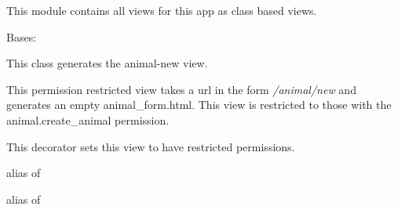 \documentclass[letterpaper,10pt,english]{sphinxmanual}
\begin{document}
This module contains all views for this app as class based views.


\begin{fulllineitems}
\label{api:mousedb.animal.views.AnimalCreate}
Bases: \href{http://docs.djangoproject.com/en/dev/ref/class-based-views/\#django.views.generic.edit.CreateView}{}

This class generates the animal-new view.

This permission restricted view takes a url in the form \emph{/animal/new} and generates an empty animal\_form.html.
This view is restricted to those with the animal.create\_animal permission.


\begin{fulllineitems}
\label{api:mousedb.animal.views.AnimalCreate.dispatch}
This decorator sets this view to have restricted permissions.

\end{fulllineitems}



\begin{fulllineitems}
\label{api:mousedb.animal.views.AnimalCreate.form_class}
alias of 

\end{fulllineitems}



\begin{fulllineitems}
\label{api:mousedb.animal.views.AnimalCreate.model}
alias of 

\end{fulllineitems}


\end{fulllineitems}


\end{document}
